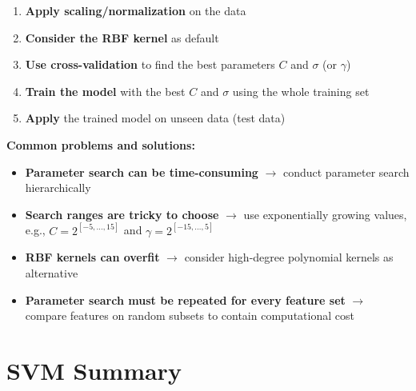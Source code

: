 \documentclass[11pt,a4paper]{article}
\theoremstyle{definition}
\theoremstyle{plain}
\theoremstyle{remark}
\begin{document}
\begin{tcolorbox}[colback=purple!5!white,colframe=purple!75!black,title=\textbf{SVM Implementation Pipeline}]
\begin{enumerate}
    \item \textbf{Apply scaling/normalization} on the data
    \item \textbf{Consider the RBF kernel} as default
    \item \textbf{Use cross-validation} to find the best parameters $C$ and $\sigma$ (or $\gamma$)
    \item \textbf{Train the model} with the best $C$ and $\sigma$ using the whole training set
    \item \textbf{Apply} the trained model on unseen data (test data)
\end{enumerate}
\end{tcolorbox}

\textbf{Common problems and solutions:}
\begin{itemize}
    \item \textbf{Parameter search can be time-consuming} $\rightarrow$ conduct parameter search hierarchically
    \item \textbf{Search ranges are tricky to choose} $\rightarrow$ use exponentially growing values, e.g., $C = 2^{[-5, \ldots, 15]}$ and $\gamma = 2^{[-15, \ldots, 5]}$
    \item \textbf{RBF kernels can overfit} $\rightarrow$ consider high-degree polynomial kernels as alternative
    \item \textbf{Parameter search must be repeated for every feature set} $\rightarrow$ compare features on random subsets to contain computational cost
\end{itemize}


\section{SVM Summary}
\end{document}
